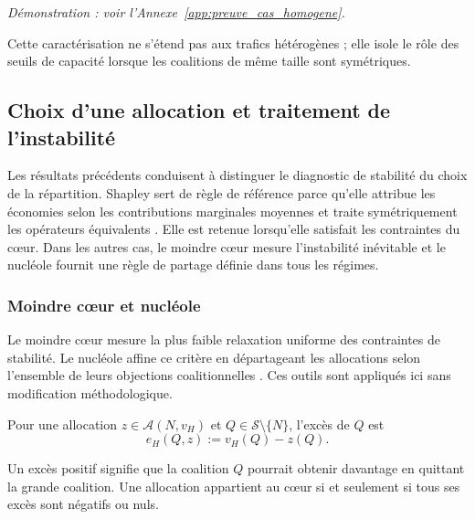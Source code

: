 \emph{Démonstration : voir l'Annexe~\ref{app:preuve_cas_homogene}.}

Cette caractérisation ne s'étend pas aux trafics hétérogènes ; elle isole le
rôle des seuils de capacité lorsque les coalitions de même taille sont
symétriques.


\subsection{Choix d'une allocation et traitement de l'instabilité}

Les résultats précédents conduisent à distinguer le diagnostic de stabilité
du choix de la répartition. Shapley sert de règle de référence parce qu'elle
attribue les économies selon les contributions marginales moyennes et traite
symétriquement les opérateurs équivalents \cite{shapley1953value}. Elle est
retenue lorsqu'elle satisfait les contraintes du cœur. Dans les autres cas,
le moindre cœur mesure l'instabilité inévitable et le nucléole fournit une
règle de partage définie dans tous les régimes.

\subsubsection{Moindre cœur et nucléole}
\label{subsubsec:nucleole}

Le moindre cœur mesure la plus faible relaxation uniforme des contraintes de
stabilité. Le nucléole affine ce critère en départageant les allocations selon
l'ensemble de leurs objections coalitionnelles \cite{schmeidler1969}. Ces
outils sont appliqués ici sans modification méthodologique.

\begin{definition}
Pour une allocation $z\in\mathcal A(N,v_H)$ et
\(Q\in\mathcal S\setminus\{N\}\), l'excès de $Q$ est
\[
    e_H(Q,z):=v_H(Q)-z(Q).
\]
\end{definition}

Un excès positif signifie que la coalition $Q$ pourrait obtenir davantage
en quittant la grande coalition. Une allocation appartient au cœur si et
seulement si tous ses excès sont négatifs ou nuls.

